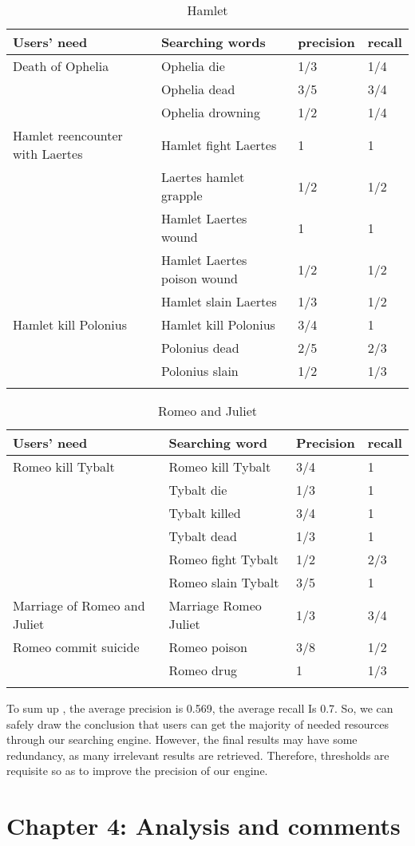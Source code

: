 \documentclass[12pt]{article}
\begin{document}
\begin{longtabu} to \textwidth {X[4,l] X[4,l] X[1,c] X[1,c]}
	\hline
	Users’ need &	Searching words &	precision&	recall\\
	\hline
	Death of Ophelia&	Ophelia die&	1/3&	1/4\\
	&	Ophelia dead&	3/5&	3/4\\
	&	Ophelia drowning &1/2&	1/4\\
	\hline 
	Hamlet reencounter with Laertes &	Hamlet fight Laertes &	1&	1\\
	&	Laertes hamlet grapple & 1/2&	1/2\\
	&	Hamlet Laertes wound&	1&	1\\
	&	Hamlet Laertes poison wound &	1/2&	1/2\\
	&	Hamlet slain Laertes&	1/3&	1/2\\
	\hline
	Hamlet kill Polonius &	Hamlet kill Polonius &	3/4&	1\\
	&	Polonius dead&	2/5&	2/3\\
	&	Polonius slain&	1/2&	1/3\\
	\hline
	\caption{Hamlet}
\end{longtabu}
\begin{longtabu}to \textwidth {X[4,l] X[4,l] X[1,c] X[1,c]}
	\hline
	Users’ need&	Searching word&	Precision&	recall\\
	\hline
	Romeo kill Tybalt &	Romeo kill Tybalt&	3/4&	1\\
	&	Tybalt die&	1/3&	1\\
	&	Tybalt killed &	3/4&	1\\
	&	Tybalt dead&	1/3&	1\\
	&	Romeo fight Tybalt&	1/2&	2/3\\
	&	Romeo slain Tybalt&	3/5&	1\\
	\hline
	Marriage of Romeo and Juliet &	Marriage Romeo Juliet&	1/3&	3/4\\
	\hline
	Romeo commit suicide&	Romeo poison&	3/8&	1/2\\
	&	Romeo drug&	1&	1/3\\
	\hline
	\caption{Romeo and Juliet}
\end{longtabu}
To sum up , the average precision is 0.569, the average recall Is 0.7. So, we can safely draw the conclusion that users can get the majority of needed resources through our searching engine. However, the final results may have some redundancy, as many irrelevant results are retrieved. 
Therefore, thresholds are requisite so as to improve the precision of our engine.
\section{Chapter 4: Analysis and comments}
\end{document}
